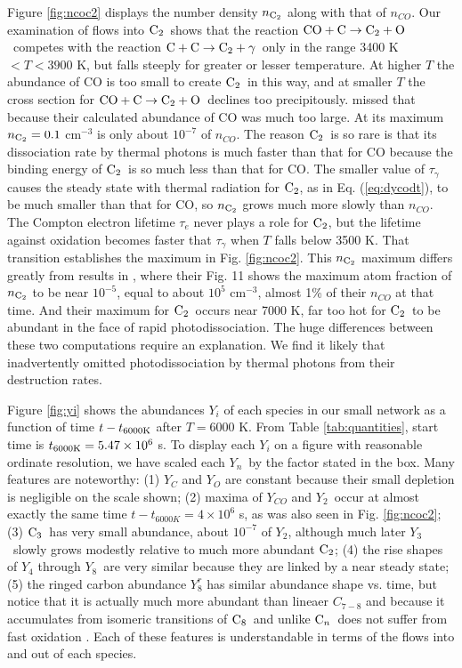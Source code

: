\documentclass[manuscript]{aastex}
\newcommand{\ctwo}{{\rm C}_2}
\newcommand{\cthree}{{\rm C}_3}
\newcommand{\ceight}{{\rm C}_8}
\newcommand{\cenn}{{\rm C}_n}
\newcommand{\twoctoctwo}{${\rm C} + {\rm C} \to \ctwo + \gamma$}
\newcommand{\coctoctwo}{${\rm CO} + {\rm C} \to \ctwo + {\rm O}$}
\begin{document}
\begin{CJK*}{UTF8}{gbsn}
Figure \ref{fig:ncoc2} displays the number density $n_{\ctwo}$ along with
that of $n_{CO}$.
Our examination of flows into $\ctwo$\ shows that the reaction
\coctoctwo\ competes with the reaction \twoctoctwo\ only in the
range 3400 K $< T < 3900$ K, but falls steeply for greater or lesser
temperature.  At higher $T$ the abundance of CO is too small to create
$\ctwo$\ in this way, and at smaller $T$ the cross section for \coctoctwo\
declines too precipitously.  \citet{2009ApJ...703..642C} missed that
because their calculated abundance of CO was much too large.
At its maximum $n_{\ctwo} =0.1$ cm$^{-3}$ is only about
$10^{-7}$ of $n_{CO}$. The reason $\ctwo$\ is so rare is that its dissociation
rate by thermal photons is much faster than that for CO because the binding
energy of $\ctwo$\ is
so much less than that for CO.
The smaller value of $\tau_\gamma$ causes the steady state with thermal
radiation for $\ctwo$, as in Eq. (\ref{eq:dycodt}), to be much smaller than 
that for CO, so $n_{\ctwo}$ grows much more slowly than $n_{CO}$.  The Compton
electron lifetime $\tau_e$ never plays a role for $\ctwo$, but the
lifetime against oxidation becomes faster that $\tau_\gamma$ when $T$
falls below 3500 K.  That transition establishes the maximum in
Fig. \ref{fig:ncoc2}.
This $n_{\ctwo}$
maximum differs greatly
from results in \citet{2009ApJ...703..642C}, where their Fig. 11 shows the
maximum atom fraction of $n_{\ctwo}$ to be near $10^{-5}$,
equal to about $10^5$ cm$^{-3}$, almost 1\% of their $n_{CO}$ at that time.
And their maximum for $\ctwo$\ occurs near 7000 K, far too hot for $\ctwo$\ to
be abundant in the face of rapid photodissociation. The huge differences between
these two computations require an explanation. We find it likely that
\cite{2009ApJ...703..642C} inadvertently omitted photodissociation by thermal
photons from their destruction rates.  


Figure \ref{fig:yi}
shows the abundances $Y_i$ of each species in our small network as a
function of time $t-t_{6000 {\rm K}}$ after $T=6000$ K.
From Table \ref{tab:quantities},
start time is $t_{6000 {\rm K}} =5.47 \times 10^6$ s.
To display each $Y_i$ on a figure with
reasonable ordinate resolution, we have scaled each $Y_n$\ by the factor
stated in the box. Many features are noteworthy: (1) $Y_C$ and $Y_O$ 
are constant
because their small depletion is negligible on the scale shown;
(2) maxima of $Y_{CO}$ and $Y_2$\ occur at almost exactly the same time
$t-t_{6000K}= 4 \times 10^6$ s, as was also seen in Fig. \ref{fig:ncoc2};
(3) $\cthree$\ has very small abundance, about $10^{-7}$ of $Y_2$, 
although much later $Y_3$\ slowly grows modestly
relative to much more abundant $\ctwo$; (4) the rise shapes of $Y_4$
through $Y_8$\ are very similar because they are linked by a near steady
state; (5) the ringed carbon abundance $Y_8^r$ has similar abundance shape 
vs. time,
but notice that it is actually much more abundant than lineaer $C_{7-8}$ and
because it accumulates from isomeric transitions of $\ceight$\
and unlike $\cenn$\ does not
suffer from fast oxidation \citep{1999Sci...283.1290C}. Each of these
features is understandable in terms of the flows into and out of each species. 


\end{CJK*}
\end{document}
